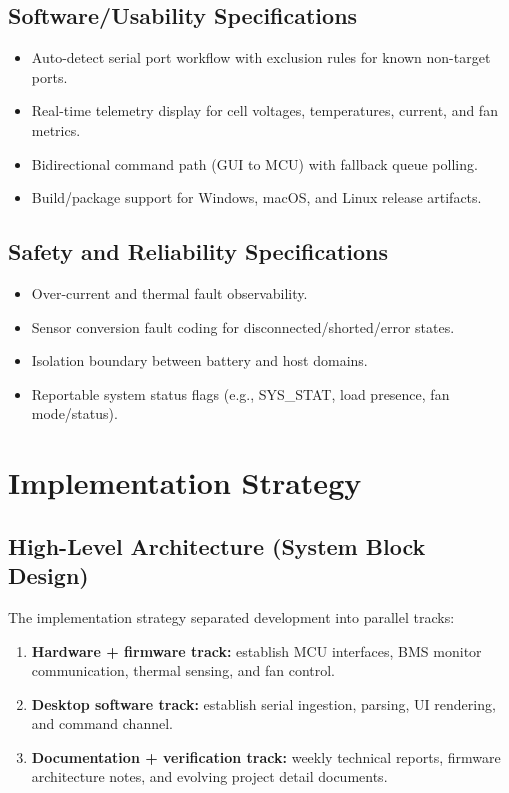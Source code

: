\documentclass[12pt]{article}
\begin{document}
\subsection{Software/Usability Specifications}
\begin{itemize}[leftmargin=1.2cm]
    \item Auto-detect serial port workflow with exclusion rules for known non-target ports.
    \item Real-time telemetry display for cell voltages, temperatures, current, and fan metrics.
    \item Bidirectional command path (GUI to MCU) with fallback queue polling.
    \item Build/package support for Windows, macOS, and Linux release artifacts.
\end{itemize}

\subsection{Safety and Reliability Specifications}
\begin{itemize}[leftmargin=1.2cm]
    \item Over-current and thermal fault observability.
    \item Sensor conversion fault coding for disconnected/shorted/error states.
    \item Isolation boundary between battery and host domains.
    \item Reportable system status flags (e.g., SYS\_STAT, load presence, fan mode/status).
\end{itemize}

\section{Implementation Strategy}

\subsection{High-Level Architecture (System Block Design)}
The implementation strategy separated development into parallel tracks:
\begin{enumerate}[leftmargin=1.2cm]
    \item \textbf{Hardware + firmware track:} establish MCU interfaces, BMS monitor communication, thermal sensing, and fan control.
    \item \textbf{Desktop software track:} establish serial ingestion, parsing, UI rendering, and command channel.
    \item \textbf{Documentation + verification track:} weekly technical reports, firmware architecture notes, and evolving project detail documents.
\end{enumerate}
\end{document}
